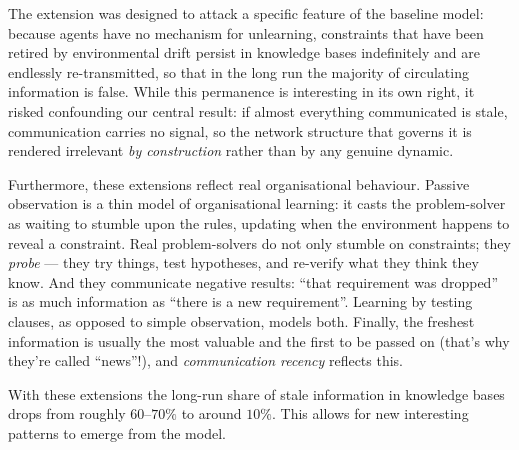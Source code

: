 \documentclass{article}
\begin{document}
The extension was designed to attack a specific feature of the baseline model: because agents have no mechanism for unlearning, constraints that have been retired by environmental drift persist in knowledge bases indefinitely and are endlessly re-transmitted, so that in the long run the majority of circulating information is false. While this permanence is interesting in its own right, it risked confounding our central result: if almost everything communicated is stale, communication carries no signal, so the network structure that governs it is rendered irrelevant \textit{by construction} rather than by any genuine dynamic.

Furthermore, these extensions reflect real organisational behaviour. Passive observation is a thin model of organisational learning: it casts the problem-solver as waiting to stumble upon the rules, updating when the environment happens to reveal a constraint. Real problem-solvers do not only stumble on constraints; they \emph{probe} --- they try things, test hypotheses, and re-verify what they think they know. And they communicate negative results: ``that requirement was dropped'' is as much information as ``there is a new requirement''. Learning by testing clauses, as opposed to simple observation, models both. Finally, the freshest information is usually the most valuable and the first to be passed on (that's why they're called ``news''!), and \emph{communication recency} reflects this.

With these extensions the long-run share of stale information in knowledge bases drops from roughly $60$--$70\%$ to around $10\%$. This allows for new interesting patterns to emerge from the model.

\end{document}
